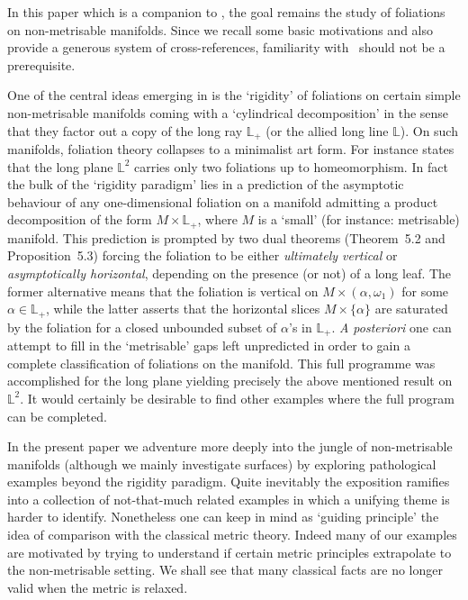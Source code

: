 \documentclass{amsart}
\begin{document}
In this paper which is a companion to \cite{BGG}, the goal remains the study of foliations on non-metrisable manifolds. Since we recall some basic motivations and also provide a generous system of
cross-references, familiarity with~\cite{BGG} should not be a prerequisite.

One of the central ideas emerging in \cite{BGG} is the `rigidity' of foliations on certain simple non-metrisable manifolds coming with a `cylindrical decomposition' in the sense that they factor out a copy of the long ray ${\mathbb L}_+$ (or the allied long line ${\mathbb L}$). On such manifolds, foliation theory
collapses to a minimalist art form. For instance \cite[Corollary~7.7]{BGG} states that the long plane ${\mathbb L}^2$ carries only two foliations up to homeomorphism. In fact the bulk of the `rigidity paradigm' lies in a prediction of the asymptotic behaviour of any one-dimensional foliation on a manifold admitting a product decomposition of the form $M\times {\mathbb L}_+$, where $M$ is a `small' (for instance: metrisable) manifold. This prediction is prompted by two dual theorems (Theorem~5.2 and Proposition~5.3) forcing the foliation to be either \emph{ultimately vertical} or \emph{asymptotically
horizontal}, depending on the presence (or not) of a long leaf. The former alternative means that the foliation is vertical on $M\times (\alpha, \omega_1)$ for some $\alpha\in{\mathbb L}_+$, while the latter asserts that the horizontal slices $M\times \{\alpha\}$ are saturated by the foliation for a closed unbounded subset of $\alpha$'s in ${\mathbb L}_+$. \emph{A posteriori} one can attempt to fill in the `metrisable' gaps left unpredicted in order to gain a complete classification of foliations on the manifold. This full programme was accomplished for the long plane yielding precisely the above mentioned result on ${\mathbb L}^2$. It would certainly be desirable to find other examples where the full program can be completed. 

In the present paper we adventure more deeply into the jungle of non-metrisable manifolds (although we mainly investigate surfaces) by exploring pathological examples beyond the rigidity paradigm. Quite inevitably the exposition ramifies into a collection of not-that-much related examples in which a unifying theme is harder to identify. Nonetheless one can keep in mind as `guiding principle' the idea of comparison with the classical metric theory. Indeed many of our examples  are motivated by trying to understand if certain metric principles extrapolate to the non-metrisable setting. We shall see that many classical facts are no longer valid when the metric is relaxed. 
\end{document}

